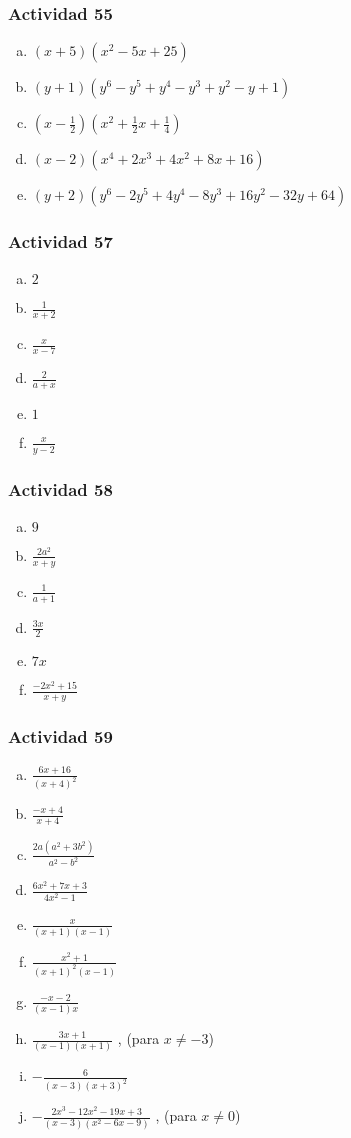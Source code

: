 \documentclass[a4paper, twocolumn]{article}
\begin{document}
\subsubsection*{Actividad 55}
\begin{enumerate}[a)]
\item $(x+5)(x^2 -5x + 25)$
\item $(y+1)(y^6-y^5+y^4-y^3+y^2-y+1)$
\item $(x-\frac{1}{2})(x^2 + \frac{1}{2} x + \frac{1}{4})$
\item $(x-2)(x^4+2x^3+4x^2+8x+16)$
\item $(y+2)(y^6 - 2y^5 + 4y^4 - 8y^3 + 16y^2 - 32y + 64)$
\end{enumerate}

\subsubsection*{Actividad 57}
\begin{enumerate}[a)]
\item $2$
\item $\frac{1}{x+2}$
\item $\frac{x}{x-7}$
\item $\frac{2}{a+x}$
\item $1$
\item $\frac{x}{y-2}$
\end{enumerate}

\subsubsection*{Actividad 58}
\begin{enumerate}[a)]
\item $9$
\item $\frac{2a^2}{x+y}$
\item $\frac{1}{a+1}$
\item $\frac{3x}{2}$
\item $7x$
\item $\frac{-2x^2 + 15}{x+y}$
\end{enumerate}

\subsubsection*{Actividad 59}
\begin{enumerate}[a)]
\item $\frac{6x+16}{(x+4)^2}$
\item $\frac{-x+4}{x+4}$
\item $\frac{2a(a^2+3b^2)}{a^2 - b^2}$
\item $\frac{6x^2+7x+3}{4x^2-1}$
\item $\frac{x}{(x+1)(x-1)}$
\item $\frac{x^2 + 1}{(x+1)^2(x-1)}$
\item $\frac{-x-2}{(x-1)x}$
\item $\frac{3x+1}{(x-1)(x+1)}$ , (para $x \neq -3$)
\item $-\frac{6}{(x-3)(x+3)^2}$
\item $-\frac{2x^3-12x^2-19x+3}{(x-3)(x^2-6x-9)}$ , (para $x \neq 0$)	
\end{enumerate}
\end{document}

